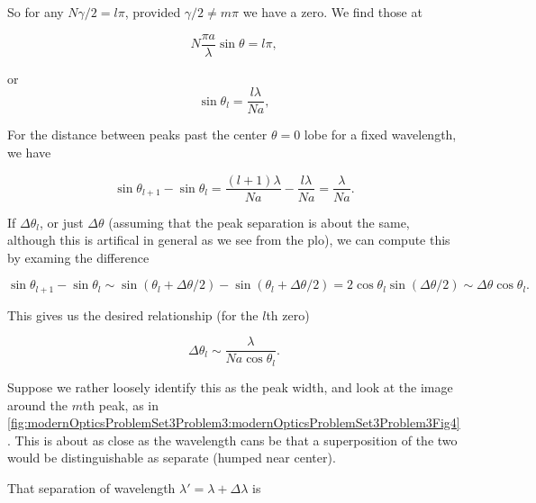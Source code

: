 {So for any $N \gamma/2 = l \pi$, provided $\gamma/2 \ne m \pi$ we have a zero.  We find those at

\begin{dmath}\label{eqn:modernOptics:problemSet3:3:380}
N \frac{\pi a}{\lambda} \sin\theta = l \pi,
\end{dmath}

or
\begin{dmath}\label{eqn:modernOptics:problemSet3:3:400}
\sin\theta_l = \frac{l \lambda}{N a},
\end{dmath}

For the distance between peaks past the center $\theta = 0$ lobe for a fixed wavelength, we have

\begin{dmath}\label{eqn:modernOptics:problemSet3:3:420}
\sin\theta_{l+1} - \sin\theta_l = 
\frac{(l+1) \lambda}{N a}
-
\frac{l \lambda}{N a}
=
\frac{\lambda}{N a}.
\end{dmath}

If $\Delta \theta_l$, or just $\Delta \theta$ (assuming that the peak separation is about the same, although this is artifical in general as we see from the plo), we can compute this by examing the difference

\begin{dmath}\label{eqn:modernOptics:problemSet3:3:440}
\sin\theta_{l+1} - \sin\theta_l 
\sim 
\sin(\theta_l + \Delta \theta/2)
-\sin(\theta_l + \Delta \theta/2)
= 2 \cos \theta_l \sin (\Delta \theta/2)
\sim \Delta \theta \cos\theta_l.
\end{dmath}

This gives us the desired relationship (for the $l$th zero)

\begin{dmath}\label{eqn:modernOptics:problemSet3:3:460}
\boxed{
\Delta \theta_l \sim \frac{\lambda}{N a \cos\theta_l}.
}
\end{dmath}

Suppose we rather loosely identify this as the peak width, and look at the image around the $m$th peak, as in \cref{fig:modernOpticsProblemSet3Problem3:modernOpticsProblemSet3Problem3Fig4}.  This is about as close as the wavelength cans be that a superposition of the two would be distinguishable as separate (humped near center).


That separation of wavelength $\lambda' = \lambda + \Delta \lambda$ is

}

